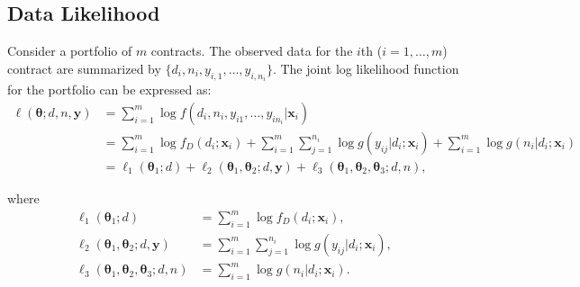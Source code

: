 \documentclass[11pt]{article}
\begin{document}
\subsection{Data Likelihood}

Consider a portfolio of $m$ contracts. The observed data for the $i$th ($i=1,\ldots,m$) contract are summarized by $\{d_i,n_i,y_{i,1},\ldots,y_{i,n_i}\}$. The joint log likelihood function for the portfolio can be expressed as:
\begin{equation} \label{eq:jointloglik}
\begin{aligned} 
\ell(\boldsymbol{\theta}; d, n, \boldsymbol{y}) &= \sum_{i=1}^m \log f(d_i,n_i,y_{i1},\ldots,y_{in_i}|\bm{x}_i) \\
	&=  \sum_{i=1}^m \log f_D(d_i;\bm{x}_i)  + \sum_{i=1}^m \sum_{j=1}^{n_i}\log  g(y_{ij}|d_i;\bm{x}_i) +  \sum_{i=1}^m \log g(n_i|d_i;\bm{x}_i)   \\
	&= \ell_1(\boldsymbol{\theta}_1;d) + \ell_2(\boldsymbol{\theta}_1, \boldsymbol{\theta}_2;d, \boldsymbol{y}) + \ell_3(\boldsymbol{\theta}_1, \boldsymbol{\theta}_2, \boldsymbol{\theta}_3;d, n), 
\end{aligned}
\end{equation}

where
\begin{align*}
\ell_1(\boldsymbol{\theta}_1;d)	&=  \sum_{i=1}^m \log f_D(d_i;\bm{x}_i),   \\
 \ell_2(\boldsymbol{\theta}_1, \boldsymbol{\theta}_2;d, \boldsymbol{y}) &= \sum_{i=1}^m \sum_{j=1}^{n_i}\log  g(y_{ij}|d_i;\bm{x}_i), \\
  \ell_3(\boldsymbol{\theta}_1, \boldsymbol{\theta}_2, \boldsymbol{\theta}_3;d, n)&= \sum_{i=1}^m \log g(n_i|d_i;\bm{x}_i).
\end{align*}
\end{document}
